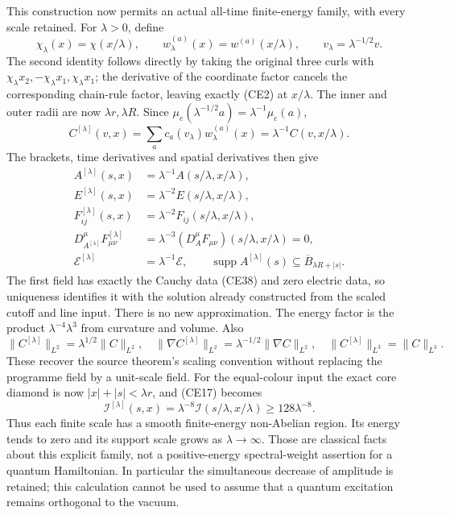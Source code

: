 \documentclass[11pt]{article}
\begin{document}
This construction now permits an actual all-time finite-energy family,
with every scale retained. For \(\lambda>0\), define
\[
 \chi_\lambda(x)=\chi(x/\lambda),\qquad
 w^{(a)}_\lambda(x)=w^{(a)}(x/\lambda),\qquad
 v_\lambda=\lambda^{-1/2}v.
\]
The second identity follows directly by taking the original three
curls with \(\chi_\lambda x_2,-\chi_\lambda x_1,\chi_\lambda x_1\);
the derivative of the coordinate factor cancels the corresponding
chain-rule factor, leaving exactly (CE2) at \(x/\lambda\).
The inner and outer radii are now \(\lambda r,\lambda R\).
Since \(\mu_e(\lambda^{-1/2}a)=\lambda^{-1}\mu_e(a)\),
\[
 C^{[\lambda]}(v,x)
 =\sum_a c_a(v_\lambda)w^{(a)}_\lambda(x)
 =\lambda^{-1}C(v,x/\lambda).
 \tag{CE38}
\]
The brackets, time derivatives and spatial derivatives then give
\[
 \begin{aligned}
 A^{[\lambda]}(s,x)&=\lambda^{-1}A(s/\lambda,x/\lambda),\\
 E^{[\lambda]}(s,x)&=\lambda^{-2}E(s/\lambda,x/\lambda),\\
 F_{ij}^{[\lambda]}(s,x)&=\lambda^{-2}F_{ij}(s/\lambda,x/\lambda),\\
 D_{A^{[\lambda]}}^\mu F_{\mu\nu}^{[\lambda]}
   &=\lambda^{-3}(D_A^\mu F_{\mu\nu})(s/\lambda,x/\lambda)=0,\\
 \mathscr E^{[\lambda]}&=\lambda^{-1}\mathscr E,\qquad
 \operatorname{supp}A^{[\lambda]}(s)
       \subseteq\overline B_{\lambda R+|s|}.
 \end{aligned}\tag{CE39}
\]
The first field has exactly the Cauchy data (CE38) and zero electric
data, so uniqueness identifies it with the solution already constructed
from the scaled cutoff and line input. There is no new approximation.
The energy factor is the product \(\lambda^{-4}\lambda^3\) from curvature
and volume. Also
\[
 \|C^{[\lambda]}\|_{L^2}=\lambda^{1/2}\|C\|_{L^2},\quad
 \|\nabla C^{[\lambda]}\|_{L^2}=\lambda^{-1/2}\|\nabla C\|_{L^2},\quad
 \|C^{[\lambda]}\|_{L^3}=\|C\|_{L^3}.
 \tag{CE40}
\]
These recover the source theorem's scaling convention without
replacing the programme field by a unit-scale field.
For the equal-colour input the exact core diamond is now
\(|x|+|s|<\lambda r\), and (CE17) becomes
\[
 \mathcal I^{[\lambda]}(s,x)
 =\lambda^{-8}\mathcal I(s/\lambda,x/\lambda)
 \geq128\lambda^{-8}.
 \tag{CE41}
\]
Thus each finite scale has a smooth finite-energy non-Abelian region.
Its energy tends to zero and its support scale grows as
\(\lambda\to\infty\). Those are classical facts about this explicit
family, not a positive-energy spectral-weight assertion for a quantum
Hamiltonian. In particular the simultaneous decrease of amplitude is
retained; this calculation cannot be used to assume that a quantum
excitation remains orthogonal to the vacuum.
\end{document}
